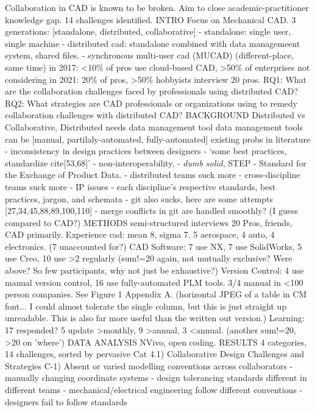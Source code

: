 \documentclass[journal,12pt,onecolumn,]{IEEEtran}
\begin{document}
Collaboration in CAD is known to be broken.
Aim to close academic-practitioner knowledge gap.
14 challenges identified.
INTRO
Focus on Mechanical CAD.
3 generations: [standalone, distributed, collaborative]
- standalone: single user, single machine
- distributed cad: standalone combined with data managemeent system, shared files.
- synchronous multi-user cad (MUCAD) (different-place, same time)
in 2017: <10\% of pros use cloud-based CAD, >50\% of enterprises not considering
in 2021: 20\% of pros, >50\% hobbyists
interview 20 pros.
RQ1: What are the collaboration challenges faced by professionals using distributed CAD?
RQ2: What strategies are CAD professionals or organizations using to remedy collaboration challenges with distributed CAD?
BACKGROUND
Distributed vs Collaborative, Distributed needs data management tool
data management tools can be [manual, partilaly-automated, fully-automated]
existing probs in literature
- inconsistency in design practices between designers
- `some best practices, standardize cite[53,68]'
- non-interoperability, 
- \textit{dumb solid}, STEP - Standard for the Exchange of Product Data.
- distributed teams suck more
- cross-discipline teams suck more
- IP issues
- each discipline's respective standards, best practices, jargon, and schemata
- git also sucks, here are some attempts [27,34,45,88,89,100,110]
- merge conflicts in git are handled smoothly? (I guess compared to CAD?)
METHODS
semi-structured interviews
20 Pros, friends, CAD primarily. Experience cad: mean 8, sigma 7.
5 aerospace, 4 auto, 4 electronics. (7 unaccounted for?)
CAD Software: 7 use NX, 7 use SolidWorks, 5 use Creo, 10 use >2 regularly (sum!=20 again, not mutually exclusive? Were above? So few participants, why not just be exhaustive?)
Version Control: 4 use manual version control, 16 use fully-automated PLM tools. 3/4 manual in <100 person companies.
See Figure 1 Appendix A. (horizontal JPEG of a table in CM font... I could almost tolerate the single column, but this is just straight up unreadable. This is also far more useful than the written out version.)
Learning: 17 responded? 5 update >monthly, 9 >annual, 3 <annual. (another sum!=20, >20 on 'where')
DATA ANALYSIS
NVivo, open coding.
RESULTS
4 categories, 14 challenges, sorted by pervasive
Cat 4.1) Collaborative Design Challenges and Strategies
C-1) Absent or varied modelling conventions across collaborators
 - manually changing coordinate systems
 - design tolerancing standards different in different teams
 - mechanical/electrical engineering follow different conventions
 - designers fail to follow standards
\end{document}

